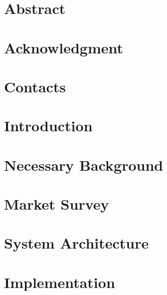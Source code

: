 \documentclass[12pt,twoside]{report}
\begin{document}
	
	
	
	\chapter*{Abstract}
	
	
	
	\chapter*{Acknowledgment}
	
	
	
	\chapter*{Contacts}
	


	\tableofcontents
	\listoffigures
	\listoftables
	\clearpage	%
	\pagestyle{fancy}
	
	
	\chapter{Introduction}
	
	
	\chapter{Necessary Background}
	
	
	\chapter{Market Survey}
	
	
	\chapter{System Architecture}
	
	
	\chapter{Implementation}
	
	
\end{document}

